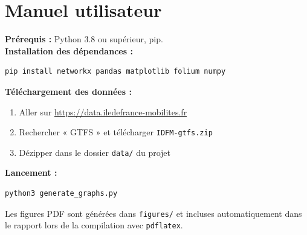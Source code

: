 \documentclass[a4paper, 12pt, twoside]{article}
\begin{document}
	\section{Manuel utilisateur}

	\textbf{Prérequis :} Python 3.8 ou supérieur, pip.\\

	\noindent\textbf{Installation des dépendances :}
\begin{lstlisting}[language=bash]
pip install networkx pandas matplotlib folium numpy
\end{lstlisting}

	\noindent\textbf{Téléchargement des données :}
	\begin{enumerate}
	    \item Aller sur \url{https://data.iledefrance-mobilites.fr}
	    \item Rechercher « GTFS » et télécharger \texttt{IDFM-gtfs.zip}
	    \item Dézipper dans le dossier \texttt{data/} du projet
	\end{enumerate}

	\noindent\textbf{Lancement :}
\begin{lstlisting}[language=bash]
python3 generate_graphs.py
\end{lstlisting}
	Les figures PDF sont générées dans \texttt{figures/} et incluses automatiquement dans le rapport lors de la compilation avec \texttt{pdflatex}.
\end{document}
